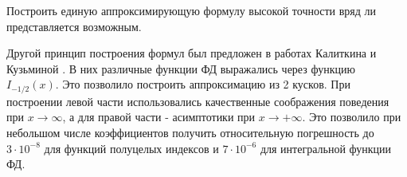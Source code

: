 Построить единую аппроксимирующую формулу высокой точности вряд ли представляется возможным. 

Другой принцип построения формул был предложен в работах Калиткина и Кузьминой \cite{Kalitkin_Kuzmina_Preprint,Kalitkin_Kuzmina_Zhvm,Kuzmina_Disser}. В них различные функции ФД выражались через функцию $I_{-1/2}(x)$. Это позволило построить аппроксимацию из 2 кусков. При построении левой части использовались качественные соображения поведения при $x \to \infty$, а для правой части - асимптотики при $x \to +\infty$. Это позволило при небольшом числе коэффициентов получить относительную погрешность до $3 \cdot 10^{-8}$ для функций полуцелых индексов и $7 \cdot 10^{-6}$ для интегральной функции ФД.

